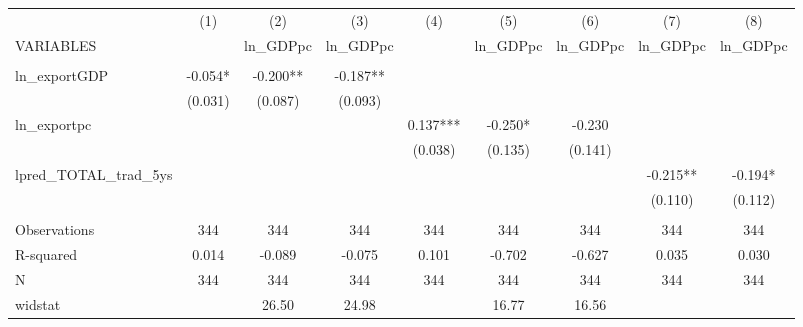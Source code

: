 \documentclass[]{article}
\begin{document}
\begin{tabular}{lcccccccc} \hline
 & (1) & (2) & (3) & (4) & (5) & (6) & (7) & (8) \\
VARIABLES &  & ln\_GDPpc & ln\_GDPpc &  & ln\_GDPpc & ln\_GDPpc & ln\_GDPpc & ln\_GDPpc \\ \hline
 &  &  &  &  &  &  &  &  \\
ln\_exportGDP & -0.054* & -0.200** & -0.187** &  &  &  &  &  \\
 & (0.031) & (0.087) & (0.093) &  &  &  &  &  \\
ln\_exportpc &  &  &  & 0.137*** & -0.250* & -0.230 &  &  \\
 &  &  &  & (0.038) & (0.135) & (0.141) &  &  \\
lpred\_TOTAL\_trad\_5ys &  &  &  &  &  &  & -0.215** & -0.194* \\
 &  &  &  &  &  &  & (0.110) & (0.112) \\
 &  &  &  &  &  &  &  &  \\
Observations & 344 & 344 & 344 & 344 & 344 & 344 & 344 & 344 \\
R-squared & 0.014 & -0.089 & -0.075 & 0.101 & -0.702 & -0.627 & 0.035 & 0.030 \\
N & 344 & 344 & 344 & 344 & 344 & 344 & 344 & 344 \\
 widstat &  & 26.50 & 24.98 &  & 16.77 & 16.56 &  &  \\ \hline
\end{tabular}
\end{document}
